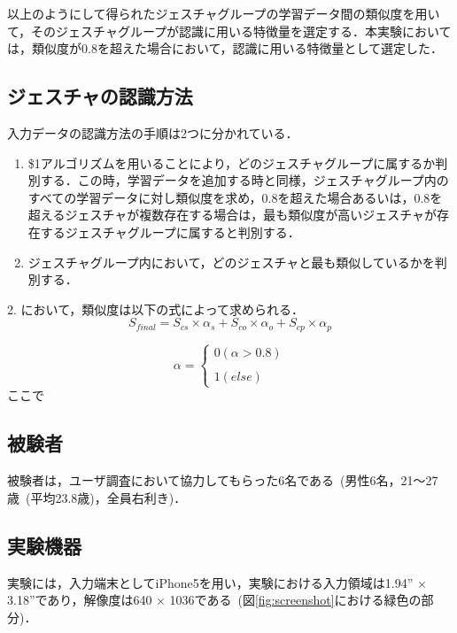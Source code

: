 以上のようにして得られたジェスチャグループの学習データ間の類似度を用いて，そのジェスチャグループが認識に用いる特徴量を選定する．本実験においては，類似度が0.8を超えた場合において，認識に用いる特徴量として選定した．


\subsection{ジェスチャの認識方法}
入力データの認識方法の手順は2つに分かれている．
\begin{enumerate}
\item \$1アルゴリズムを用いることにより，どのジェスチャグループに属するか判別する．この時，学習データを追加する時と同様，ジェスチャグループ内のすべての学習データに対し類似度を求め，0.8を超えた場合あるいは，0.8を超えるジェスチャが複数存在する場合は，最も類似度が高いジェスチャが存在するジェスチャグループに属すると判別する．
\item ジェスチャグループ内において，どのジェスチャと最も類似しているかを判別する．
\end{enumerate}
2. において，類似度は以下の式によって求められる．
\begin{equation}
S_\textit{final} = S_\textit{cs} \times α_\textit{s} + S_\textit{co} \times α_\textit{o} + S_\textit{cp} \times α_\textit{p}
\end{equation}

\begin{equation}
α = \left \{
\begin{array}{l}
0 (α>0.8) \\\\
1 (else)
\end{array}
\right.
\end{equation}
ここで

\subsection{被験者}
被験者は，ユーザ調査において協力してもらった6名である~(男性6名，21〜27歳~(平均23.8歳)，全員右利き)．

\subsection{実験機器}
実験には，入力端末としてiPhone5を用い，実験における入力領域は1.94'' × 3.18''であり，解像度は640 × 1036である~(図\ref{fig:screenshot}における緑色の部分)．

